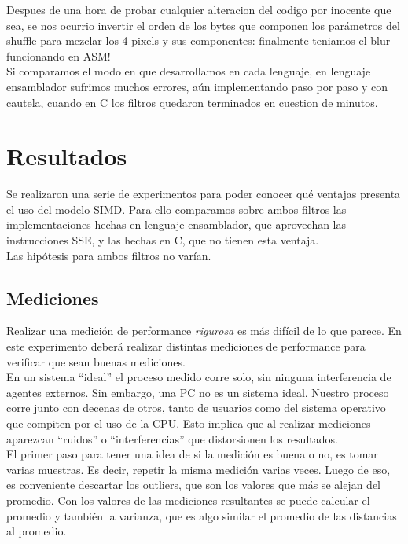 \documentclass[10pt,a4paper,spanish]{article}
\begin{document}
Despues de una hora de probar cualquier alteracion del codigo por inocente que sea, se nos ocurrio invertir el orden de los bytes que componen los parámetros del shuffle para mezclar los 4 pixels y sus componentes: finalmente teniamos el blur funcionando en ASM! \\

Si comparamos el modo en que desarrollamos en cada lenguaje, en lenguaje ensamblador sufrimos muchos errores, aún implementando paso por paso y con cautela, cuando en C los filtros quedaron terminados en cuestion de minutos.

\section{Resultados}

Se realizaron una serie de experimentos para poder conocer qué ventajas presenta el uso del modelo SIMD. Para ello comparamos sobre ambos filtros las implementaciones hechas en lenguaje ensamblador, que aprovechan las instrucciones SSE, y las hechas en C, que no tienen esta ventaja. \\

Las hipótesis para ambos filtros no varían.

\subsection{Mediciones}

Realizar una medición de performance \emph{rigurosa} es más difícil de lo que parece. En este experimento deberá realizar distintas mediciones de performance para verificar que sean buenas mediciones. \\

En un sistema ``ideal'' el proceso medido corre solo, sin ninguna interferencia de agentes externos. Sin embargo, una PC no es un sistema ideal. Nuestro proceso corre junto con decenas de otros, tanto de usuarios como del sistema operativo que compiten por el uso de la CPU. Esto implica que al realizar mediciones aparezcan ``ruidos'' o ``interferencias'' que distorsionen los resultados. \\

El primer paso para tener una idea de si la medición es buena o no, es tomar varias muestras. Es decir, repetir la misma medición varias veces. Luego de eso, es conveniente descartar los outliers, que son los valores que más se alejan del promedio. Con los valores de las mediciones resultantes se puede calcular el promedio y también la varianza, que es algo similar el promedio de las distancias al promedio. \\
\end{document}
